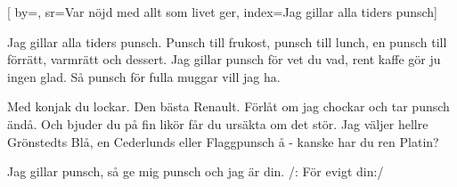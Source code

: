

[ 		%
	by={},					%
	sr={Var nöjd med allt som livet ger},					%
	index={Jag gillar alla tiders punsch}]						%



\beginverse*						%
Jag gillar alla tiders punsch.
Punsch till frukost, punsch till lunch,
en punsch till förrätt, varmrätt och dessert.
Jag gillar punsch för vet du vad,
rent kaffe gör ju ingen glad.
Så punsch för fulla muggar vill jag ha.
\endverse							%

\beginverse*						%
Med konjak du lockar.
Den bästa Renault.
Förlåt om jag chockar
och tar punsch ändå.
Och bjuder du på fin likör
får du ursäkta om det stör.
Jag väljer hellre Grönstedts Blå,
en Cederlunds eller Flaggpunsch å
- kanske har du ren Platin?
\endverse							%

\beginverse*						%
Jag gillar punsch,
så ge mig punsch och jag är din.
/: För evigt din:/
\endverse							%

\endsong							%